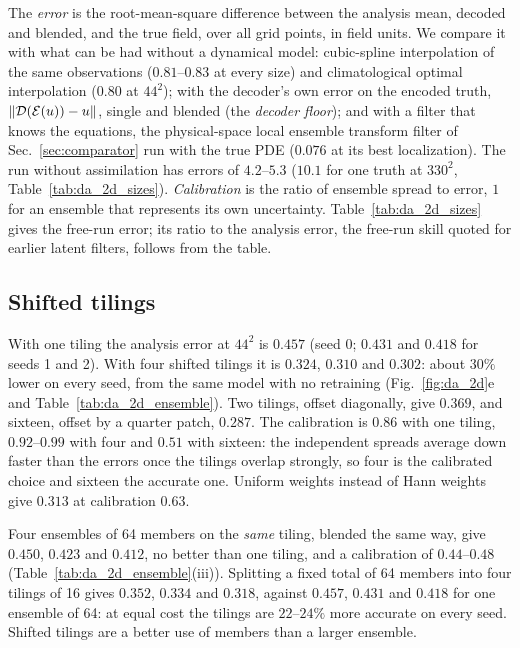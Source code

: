  The \emph{error} is the root-mean-square
difference between the analysis mean, decoded and blended, and the true
field, over all grid points, in field units. We compare it with what can
be had without a dynamical model: cubic-spline interpolation of the same
observations ($0.81$--$0.83$ at every size) and climatological optimal
interpolation ($0.80$ at $44^2$); with the decoder's own error on the
encoded truth, $\|\mathcal{D}(\mathcal{E}(u))-u\|$, single and blended (the \emph{decoder
floor}); and with a filter that knows the equations, the physical-space
local ensemble transform filter of Sec.~\ref{sec:comparator} run with the
true PDE ($0.076$ at its best localization). The run without assimilation
has errors of $4.2$--$5.3$ ($10.1$ for one truth at $330^2$, Table~\ref{tab:da_2d_sizes}). \emph{Calibration} is the ratio of ensemble
spread to error, $1$ for an ensemble that represents its own
uncertainty. Table~\ref{tab:da_2d_sizes} gives the free-run error; its ratio to the analysis error,
the free-run skill quoted for earlier latent filters, follows from the table.

\subsection{Shifted tilings}
\label{sec:da_tilings}

With one tiling the analysis error at $44^2$ is $0.457$ (seed 0; $0.431$ and
$0.418$ for seeds 1 and 2). With four shifted tilings it is $0.324$, $0.310$
and $0.302$: about $30\%$ lower on every seed, from the same model with no
retraining (Fig.~\ref{fig:da_2d}e and Table~\ref{tab:da_2d_ensemble}). Two
tilings, offset diagonally, give $0.369$, and sixteen, offset by a quarter
patch, $0.287$. The calibration is $0.86$ with one tiling, $0.92$--$0.99$ with
four and $0.51$ with sixteen: the independent spreads average down faster
than the errors once the tilings overlap strongly, so four is the
calibrated choice and sixteen the accurate one. Uniform weights instead
of Hann weights give $0.313$ at calibration $0.63$.

 Four ensembles of 64 members on
the \emph{same} tiling, blended the same way, give $0.450$, $0.423$ and $0.412$,
no better than one tiling, and a calibration of $0.44$--$0.48$
(Table~\ref{tab:da_2d_ensemble}(iii)). Splitting a fixed total of 64
members into four tilings of 16 gives $0.352$, $0.334$ and $0.318$, against
$0.457$, $0.431$ and $0.418$ for one ensemble of 64: at equal cost the tilings
are $22$--$24\%$ more accurate on every seed. Shifted tilings are a better use
of members than a larger ensemble.

